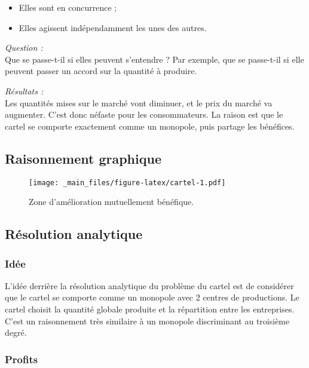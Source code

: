 \documentclass[
]{book}
\providecommand{\tightlist}{%
  \setlength{\itemsep}{0pt}\setlength{\parskip}{0pt}}
\theoremstyle{definition}
\theoremstyle{definition}
\theoremstyle{definition}
\theoremstyle{definition}
\theoremstyle{remark}
\begin{document}
\begin{itemize}
\tightlist
\item
  Elles sont en concurrence ;
\item
  Elles agissent indépendamment les unes des autres.
\end{itemize}

\emph{Question :}\\
Que se passe-t-il si elles peuvent s'entendre ?
Par exemple, que se passe-t-il si elle peuvent passer un accord sur la quantité à produire.

\emph{Résultats :}\\
Les quantités mises sur le marché vont diminuer, et le prix du marché va augmenter.
C'est donc néfaste pour les consommateurs.
La raison est que le cartel se comporte exactement comme un monopole, puis partage les bénéfices.

\hypertarget{raisonnement-graphique}{%
\subsection{Raisonnement graphique}\label{raisonnement-graphique}}

\begin{figure}
\centering
\texttt{[image: \_main\_files/figure-latex/cartel-1.pdf]}
\caption{\label{fig:cartel}Zone d'amélioration mutuellement bénéfique.}
\end{figure}

\hypertarget{ruxe9solution-analytique}{%
\subsection{Résolution analytique}\label{ruxe9solution-analytique}}

\hypertarget{iduxe9e}{%
\subsubsection{Idée}\label{iduxe9e}}

L'idée derrière la résolution analytique du problème du cartel est de considérer que le cartel se comporte comme un monopole avec 2 centres de productions.
Le cartel choisit la quantité globale produite et la répartition entre les entreprises.
C'est un raisonnement très similaire à un monopole discriminant au troisième degré.

\hypertarget{profits-2}{%
\subsubsection{Profits}\label{profits-2}}
\end{document}
